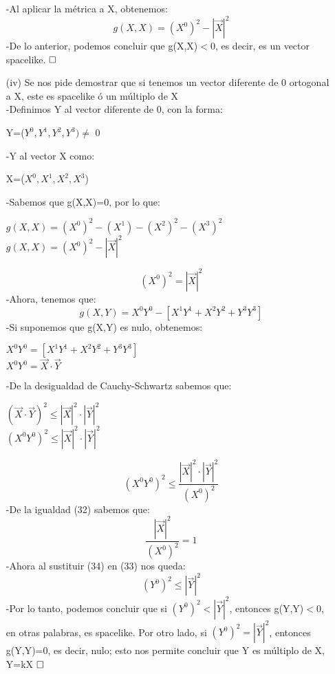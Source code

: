 \documentclass[a4paper, 11pt]{article}
\begin{document}
\begin{enumerate}
    -Al aplicar la métrica a X, obtenemos:
    \begin{equation*}
        g(X,X)=(X^{0})^2 - |\vec{X}|^2
    \end{equation*}
    -De lo anterior, podemos concluir que g(X,X)$<$0, es decir, es un vector spacelike. $\hfill\square$\\
    
    
    \item[(iv)] Se nos pide demostrar que si tenemos un vector diferente de 0 ortogonal a X, este es spacelike ó un múltiplo de X\\
    -Definimos Y al vector diferente de 0, con la forma:
    \begin{center}
        Y=($Y^{0},Y^{1},Y^{2},Y^{3})\not =$ 0
    \end{center}
    -Y al vector X como:
    \begin{center}
     X=($X^{0},X^{1},X^{2},X^{3}$)
    \end{center}
    -Sabemos que  g(X,X)=0, por lo que:
    \begin{center}
    $g(X,X)=(X^{0})^2 - (X^{1}) - (X^{2})^2 - (X^{3})^2$\\
    
    $g(X,X)=(X^{0})^2 - |\vec{X}|^2$
    \end{center}
    \begin{equation}
    (X^{0})^2 = |\vec{X}|^2    
    \end{equation}
    -Ahora, tenemos que:
    \begin{equation*}
        g(X,Y)=X^{0}Y^{0} - [X^{1}Y^{1} + X^{2}Y^{2} + Y^{3}Y^{3}]
    \end{equation*}
    -Si suponemos que g(X,Y) es nulo, obtenemos:
    \begin{center}
     $X^{0}Y^{0} = [X^{1}Y^{1} + X^{2}Y^{2} + Y^{3}Y^{3}]$\\
     $X^{0}Y^{0} = \vec{X}\cdot\vec{Y}$
    \end{center}
    -De la desigualdad de Cauchy-Schwartz sabemos que:
    \begin{center}
       $(\vec{X}\cdot\vec{Y})^2 \leq|\vec{X}|^2 \cdot |\vec{Y}|^2$\\
       $(X^{0}Y^{0})^2 \leq|\vec{X}|^2 \cdot |\vec{Y}|^2$
    \end{center}
    \begin{equation}
        (X^{0}Y^{0})^2 \leq\frac{|\vec{X}|^2\cdot |\vec{Y}|^2}{(X^{0})^2}
    \end{equation}
    -De la igualdad (32) sabemos que:
    \begin{equation}
        \frac{|\vec{X}|^2}{(X^{0})^2}=1
    \end{equation}
    -Ahora al sustituir (34) en (33) nos queda:
    \begin{equation*}
        (Y^{0})^2 \leq|\vec{Y}|^2
    \end{equation*}
    -Por lo tanto, podemos concluir que si $(Y^{0})^2 <|\vec{Y}|^2$, entonces g(Y,Y)$<$0, en otras palabras, es spacelike. Por otro lado, si $(Y^{0})^2 =|\vec{Y}|^2$, entonces g(Y,Y)=0, es decir, nulo; esto nos permite concluir que Y es múltiplo de X, Y=kX
    $\hfill\square$
\end{enumerate}
\end{document}

